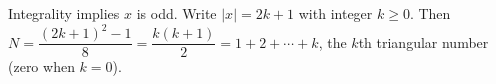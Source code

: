 Integrality implies $x$ is odd. Write $|x|=2k+1$ with integer $k\ge 0$. Then $N=\dfrac{(2k+1)^2-1}{8}=\dfrac{k(k+1)}{2}=1+2+\cdots+k$, the $k$th triangular number (zero when $k=0$).

